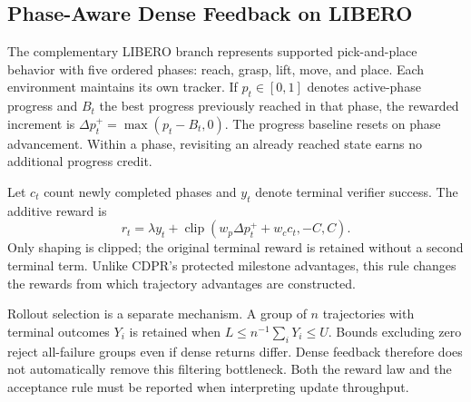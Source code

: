 \subsection{Phase-Aware Dense Feedback on LIBERO}\label{sec:dense_method}
The complementary LIBERO branch represents supported pick-and-place behavior with five ordered phases: reach, grasp, lift, move, and place. Each environment maintains its own tracker. If $p_t\in[0,1]$ denotes active-phase progress and $B_t$ the best progress previously reached in that phase, the rewarded increment is $\Delta p_t^+=\max(p_t-B_t,0)$. The progress baseline resets on phase advancement. Within a phase, revisiting an already reached state earns no additional progress credit.

Let $c_t$ count newly completed phases and $y_t$ denote terminal verifier success. The additive reward is
\begin{equation}
r_t=\lambda y_t+\operatorname{clip}(w_p\Delta p_t^++w_c c_t,-C,C).
\label{eq:dense}
\end{equation}
Only shaping is clipped; the original terminal reward is retained without a second terminal term. Unlike CDPR's protected milestone advantages, this rule changes the rewards from which trajectory advantages are constructed. 

Rollout selection is a separate mechanism. A group of $n$ trajectories with terminal outcomes $Y_i$ is retained when $L\le n^{-1}\sum_iY_i\le U$. Bounds excluding zero reject all-failure groups even if dense returns differ. Dense feedback therefore does not automatically remove this filtering bottleneck. Both the reward law and the acceptance rule must be reported when interpreting update throughput.
